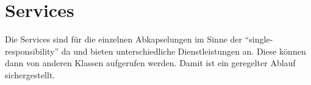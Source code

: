 \section{Services}\label{sec:Services}
Die Services sind für die einzelnen Abkapselungen im Sinne der \enquote{single-responsibility} da
und bieten unterschiedliche Dienstleistungen an.
Diese können dann von anderen Klassen aufgerufen werden.
Damit ist ein geregelter Ablauf sichergestellt.











